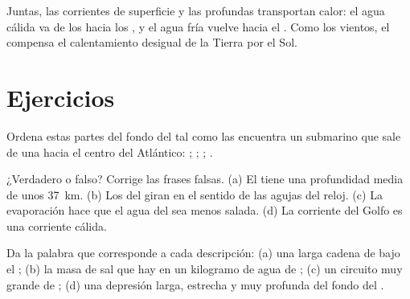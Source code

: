Juntas, las corrientes de superficie y las profundas transportan calor: el
agua cálida va de los  hacia los , y el agua fría vuelve hacia
el . Como los vientos, el  compensa el calentamiento desigual
de la Tierra por el Sol.

\section{Ejercicios}

\begin{exercise}[$\star$]\label{exo:g8:the-oceans:1}
Ordena estas partes del fondo del  tal como las encuentra un
submarino que sale de una  hacia el centro del Atlántico: ; ; ; .
\end{exercise}

\begin{exercise}[$\star$]\label{exo:g8:the-oceans:2}
¿Verdadero o falso? Corrige las frases falsas. (a) El  tiene una
profundidad media de unos \qty{37}{km}. (b) Los  del 
giran en el sentido de las agujas del reloj. (c) La evaporación hace que el
agua del  sea menos salada. (d) La corriente del Golfo es una corriente
cálida.
\end{exercise}

\begin{exercise}[$\star$]\label{exo:g8:the-oceans:3}
Da la palabra que corresponde a cada descripción: (a) una larga cadena de
 bajo el ; (b) la masa de sal que hay en un kilogramo de agua de
; (c) un circuito muy grande de ; (d) una depresión
larga, estrecha y muy profunda del fondo del .
\end{exercise}

